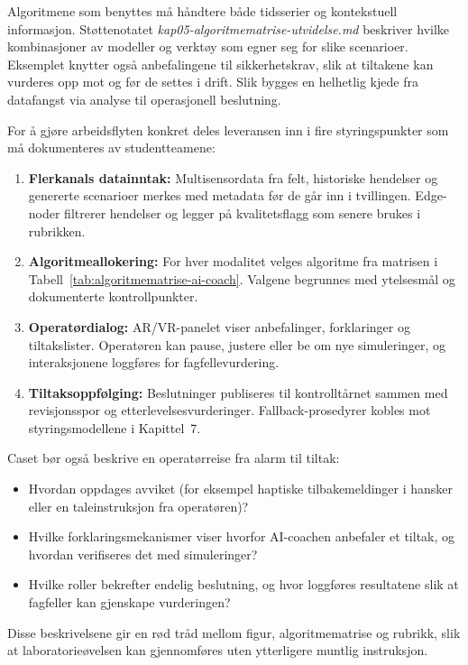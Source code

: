 Algoritmene som benyttes må håndtere både tidsserier og kontekstuell informasjon. Støttenotatet \textit{kap05-algoritmematrise-utvidelse.md} beskriver hvilke kombinasjoner av modeller og verktøy som egner seg for slike scenarioer. Eksemplet knytter også anbefalingene til sikkerhetskrav, slik at tiltakene kan vurderes opp mot \citet{iec62443-2-1} og \citet{eu2022nis2} før de settes i drift. Slik bygges en helhetlig kjede fra datafangst via analyse til operasjonell beslutning.

For å gjøre arbeidsflyten konkret deles leveransen inn i fire styringspunkter som må dokumenteres av studentteamene:
\begin{enumerate}
    \item \textbf{Flerkanals datainntak:} Multisensordata fra felt, historiske hendelser og genererte scenarioer merkes med metadata før de går inn i tvillingen. Edge-noder filtrerer hendelser og legger på kvalitetsflagg som senere brukes i rubrikken.
    \item \textbf{Algoritmeallokering:} For hver modalitet velges algoritme fra matrisen i Tabell~\ref{tab:algoritmematrise-ai-coach}. Valgene begrunnes med ytelsesmål og dokumenterte kontrollpunkter.
    \item \textbf{Operatørdialog:} AR/VR-panelet viser anbefalinger, forklaringer og tiltakslister. Operatøren kan pause, justere eller be om nye simuleringer, og interaksjonene loggføres for fagfellevurdering.
    \item \textbf{Tiltaksoppfølging:} Beslutninger publiseres til kontrolltårnet sammen med revisjonsspor og etterlevelsesvurderinger. Fallback-prosedyrer kobles mot styringsmodellene i Kapittel~7.
\end{enumerate}

Caset bør også beskrive en operatørreise fra alarm til tiltak:
\begin{itemize}
    \item Hvordan oppdages avviket (for eksempel haptiske tilbakemeldinger i hansker eller en taleinstruksjon fra operatøren)?
    \item Hvilke forklaringsmekanismer viser hvorfor AI-coachen anbefaler et tiltak, og hvordan verifiseres det med simuleringer?
    \item Hvilke roller bekrefter endelig beslutning, og hvor loggføres resultatene slik at fagfeller kan gjenskape vurderingen?
\end{itemize}

Disse beskrivelsene gir en rød tråd mellom figur, algoritmematrise og rubrikk, slik at laboratorieøvelsen kan gjennomføres uten ytterligere muntlig instruksjon.

